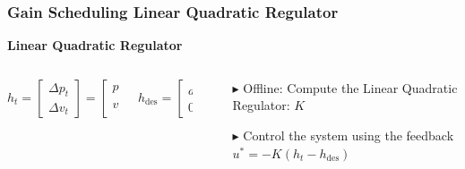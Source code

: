\documentclass[9pt, aspectratio=169]{beamer}
\begin{document}
\begin{frame}
\frametitle{Gain Scheduling Linear Quadratic Regulator}
\centering
\textcolor{emph@Thesis}{\textbf{\small{Linear Quadratic Regulator}}} 
\vspace{0.2cm}
\begin{columns}
\begin{column}{0.4\textwidth}
\centering

\begin{columns}
\begin{column}{0.6\textwidth}
\centering
\begin{block}{}
\begin{equation*}
    h_t =
    \begin{bmatrix}
        \Delta p_t  \\
        \Delta v_t
    \end{bmatrix}
	=
    \begin{bmatrix}
        p_{k,t} - p_{r,t} \\
        v_{k,t} - v_{r,t}
    \end{bmatrix}
\end{equation*}

\end{block}
\end{column}

\begin{column}{0.3\textwidth}
\centering
\begin{block}{}
\begin{equation*}
    h_{\text{des}} =
    \begin{bmatrix}
        d_{\text{des}} \\
        0
    \end{bmatrix}
\end{equation*}
\end{block}
\end{column}
\end{columns}

\end{column}

\begin{column}{0.6\textwidth}
\centering
\begin{itemize}
	\footnotesize
	\item[$\blacktriangleright$] Offline: Compute the Linear Quadratic Regulator: $K$
	\item[$\blacktriangleright$] Control the system using the feedback $u^* = - K (h_t - h_{\text{des}}) $
\end{itemize}
\end{column}
\end{columns}


\end{frame}
\end{document}

